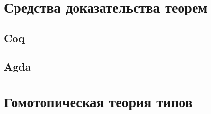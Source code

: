 \documentclass[14pt]{matmex-diploma-custom}
\begin{document}
\newpage
\section{Средства доказательства теорем}


\subsection{Coq}


\subsection{Agda}






\newpage
\section{Гомотопическая теория типов}
\end{document}
